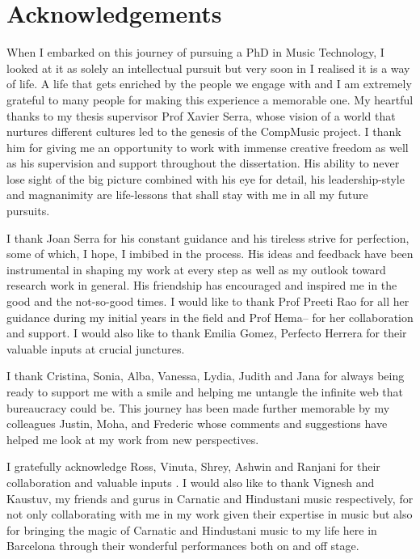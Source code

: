 \chapter*{Acknowledgements}

When I embarked on this journey of pursuing a PhD in Music Technology, I looked at it as solely an intellectual pursuit but very soon in I realised it is a way of life. A life that gets enriched by the people we engage with and I am extremely grateful to many people for making this experience a memorable one. My heartful thanks to my thesis supervisor Prof Xavier Serra, whose vision of a world that nurtures different cultures led to the genesis of the CompMusic project. I thank him for giving me an opportunity to work with immense creative freedom as well as his supervision and support throughout the dissertation. His ability to never lose sight of the big picture combined with his eye for detail, his leadership-style and magnanimity are life-lessons that shall stay with me in all my future pursuits.

I thank Joan Serra for his constant guidance and his tireless strive for perfection, some of which, I hope, I imbibed in the process. His ideas and feedback have been instrumental in shaping my work at every step as well as my outlook toward research work in general. His friendship has encouraged and inspired me in the good and the not-so-good times. I would like to thank Prof Preeti Rao for all her guidance during my initial years in the field and Prof Hema-- for her collaboration and support. I would also like to thank Emilia Gomez, Perfecto Herrera for their  valuable inputs at crucial junctures.

I thank Cristina, Sonia, Alba, Vanessa, Lydia, Judith and Jana for always being ready to support me with a smile and helping me untangle the infinite web that bureaucracy could be. This journey has been made further memorable by my colleagues Justin, Moha, and Frederic whose comments and suggestions have helped me look at my work from new perspectives. 

I gratefully acknowledge Ross, Vinuta, Shrey, Ashwin and Ranjani for their collaboration and valuable inputs . I would also like to thank Vignesh and Kaustuv, my friends and gurus in Carnatic and Hindustani music respectively, for not only collaborating with me in my work given their expertise in music but also for bringing the magic of Carnatic and Hindustani music to my life here in Barcelona through their wonderful performances both on and off stage.

